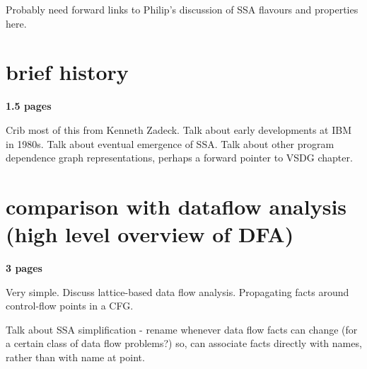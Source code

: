 Probably need forward links to Philip's discussion of
SSA flavours and properties here.


\section{brief history}

\textbf{1.5 pages}

Crib most of this from Kenneth Zadeck. 
Talk about early developments at IBM in 1980s.
Talk about eventual emergence of SSA.
Talk about other program dependence graph
representations, perhaps a forward pointer to 
VSDG chapter.



\section{comparison with dataflow analysis (high level overview of DFA)}

\textbf{3 pages}

Very simple. Discuss lattice-based data flow analysis.
Propagating facts around control-flow points in a CFG.

Talk about SSA simplification - rename whenever data flow
facts can change (for a certain class of data flow problems?)
so, can associate facts directly with names, rather than with
name at point.


